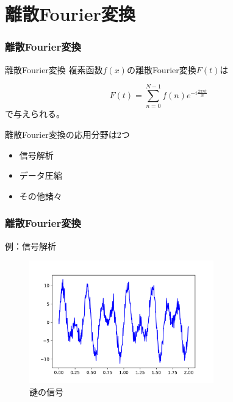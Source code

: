 \documentclass[dvipdfmx,11pt,notheorems]{beamer}
\theoremstyle{definition}
\begin{document}
\section{離散Fourier変換}

\begin{frame}[fragile]\frametitle{離散Fourier変換}

\begin{block}{離散Fourier変換}
複素函数$f(x)$の離散Fourier変換$F(t)$は

\begin{equation*}
F(t) = \sum^{N-1}_{n=0}f(n)e^{-i \frac{2\pi n  t }{N}}
\end{equation*}
で与えられる。
\end{block}

\begin{exampleblock}{離散Fourier変換の応用分野は2つ}
\begin{itemize}
\item 信号解析
\item データ圧縮
\item その他諸々
\end{itemize}
\end{exampleblock}

\end{frame}

\begin{frame}[fragile]\frametitle{離散Fourier変換}

\begin{block}{例：信号解析}
\begin{figure}
  \centering
  \includegraphics[width=8cm]{sine_curve.png}
  \caption{謎の信号}
\end{figure}

\end{block}
\end{frame}
\end{document}
